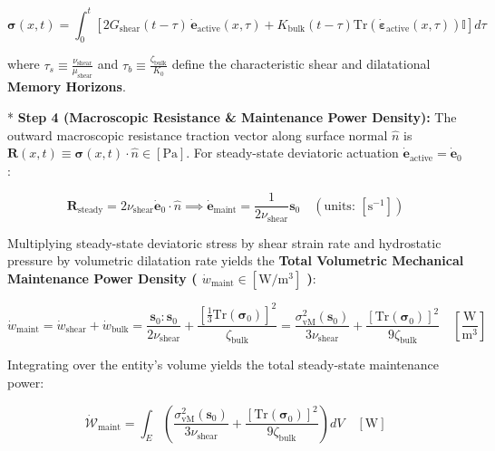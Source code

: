 \documentclass[11pt,a4paper]{article}
\theoremstyle{definition}\newtheorem{definition}{Definition}
\theoremstyle{remark}\newtheorem{remark}{Remark}
\begin{document}
\begin{equation}
\boxed{\boldsymbol{\sigma}(x, t) = \int_0^t [ 2 G_{\text{shear}}(t - \tau) \, \dot{\mathbf{e}}_{\text{active}}(x, \tau) + K_{\text{bulk}}(t - \tau) \mathrm{Tr}(\dot{\boldsymbol{\varepsilon}}_{\text{active}}(x, \tau)) \mathbb{I} ] d\tau}
\end{equation}


where $\tau_s \equiv \frac{\nu_{\text{shear}}}{\mu_{\text{shear}}}$ and $\tau_b \equiv \frac{\zeta_{\text{bulk}}}{K_0}$ define the characteristic shear and dilatational \textbf{Memory Horizons}.

* \textbf{Step 4 (Macroscopic Resistance \& Maintenance Power Density):}
The outward macroscopic resistance traction vector along surface normal $\hat{n}$ is $\mathbf{R}(x, t) \equiv \boldsymbol{\sigma}(x, t) \cdot \hat{n} \in [\mathrm{Pa}]$. For steady-state deviatoric actuation $\dot{\mathbf{e}}_{\text{active}} = \dot{\mathbf{e}}_0$:


\begin{equation}
\mathbf{R}_{\text{steady}} = 2 \nu_{\text{shear}} \dot{\mathbf{e}}_0 \cdot \hat{n} \implies \dot{\mathbf{e}}_{\text{maint}} = \frac{1}{2\nu_{\text{shear}}} \mathbf{s}_0 \quad \left( \text{units: } [\mathrm{s}^{-1}] \right)
\end{equation}


Multiplying steady-state deviatoric stress by shear strain rate and hydrostatic pressure by volumetric dilatation rate yields the \textbf{Total Volumetric Mechanical Maintenance Power Density ( $\dot{w}_{\text{maint}} \in [\mathrm{W/m^3}]$ )}:


\begin{equation}
\boxed{\dot{w}_{\text{maint}} = \dot{w}_{\text{shear}} + \dot{w}_{\text{bulk}} = \frac{\mathbf{s}_0 : \mathbf{s}_0}{2\nu_{\text{shear}}} + \frac{[\frac{1}{3}\mathrm{Tr}(\boldsymbol{\sigma}_0)]^2}{\zeta_{\text{bulk}}} = \frac{\sigma_{\mathrm{vM}}^2\left(\mathbf{s}_0\right)}{3 \nu_{\text{shear}}} + \frac{[ \mathrm{Tr} \left(\boldsymbol{\sigma}_0\right) ]^2}{9 \zeta_{\text{bulk}}} \quad [\frac{\mathrm{W}}{\mathrm{m^3}}]}
\end{equation}


Integrating over the entity's volume yields the total steady-state maintenance power:


\begin{equation}
\boxed{\dot{\mathcal{W}}_{\text{maint}} = \int_E \left( \frac{\sigma_{\mathrm{vM}}^2(\mathbf{s}_0)}{3\nu_{\text{shear}}} + \frac{[ \mathrm{Tr}(\boldsymbol{\sigma}_0) ]^2}{9\zeta_{\text{bulk}}} \right) dV \quad [\mathrm{W}]}
\end{equation}
\end{document}
